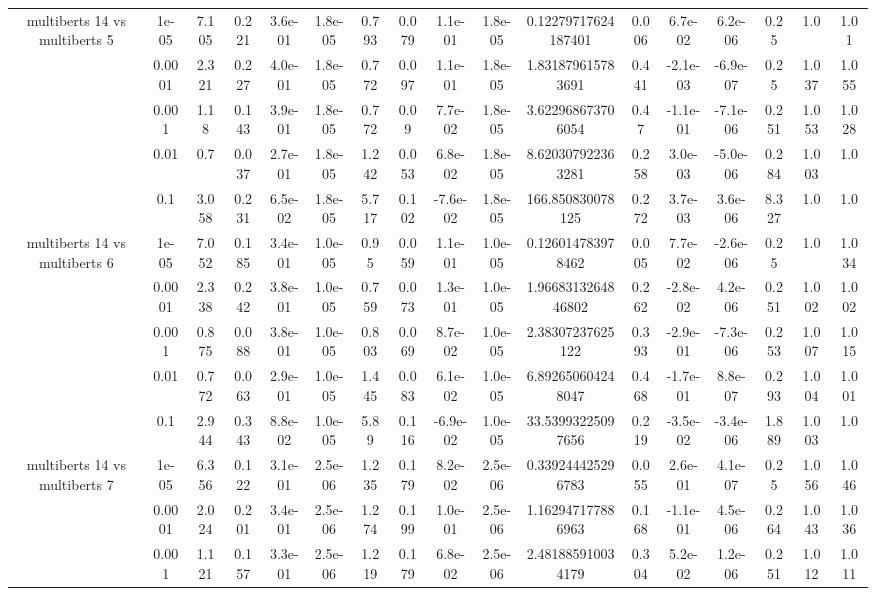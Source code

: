 \begin{tabular}{|c|c|c|c|c|c|c|c|c|c|c|c|c|c|c|c|c|}
\hline
\multirow{5}{*}{multiberts 14 vs multiberts 5} & 1e-05 & 7.105 & 0.221 & 3.6e-01 & 1.8e-05 & 0.793 & 0.079 & 1.1e-01 & 1.8e-05 & 0.12279717624187401 & 0.006 & 6.7e-02 & 6.2e-06 & 0.25 & 1.0 & 1.01 \\
 & 0.0001 & 2.321 & 0.227 & 4.0e-01 & 1.8e-05 & 0.772 & 0.097 & 1.1e-01 & 1.8e-05 & 1.831879615783691 & 0.441 & -2.1e-03 & -6.9e-07 & 0.25 & 1.037 & 1.055 \\
 & 0.001 & 1.18 & 0.143 & 3.9e-01 & 1.8e-05 & 0.772 & 0.09 & 7.7e-02 & 1.8e-05 & 3.622968673706054 & 0.47 & -1.1e-01 & -7.1e-06 & 0.251 & 1.053 & 1.028 \\
 & 0.01 & 0.7 & 0.037 & 2.7e-01 & 1.8e-05 & 1.242 & 0.053 & 6.8e-02 & 1.8e-05 & 8.620307922363281 & 0.258 & 3.0e-03 & -5.0e-06 & 0.284 & 1.003 & 1.0 \\
 & 0.1 & 3.058 & 0.231 & 6.5e-02 & 1.8e-05 & 5.717 & 0.102 & -7.6e-02 & 1.8e-05 & 166.850830078125 & 0.272 & 3.7e-03 & 3.6e-06 & 8.327 & 1.0 & 1.0 \\
\hline
\multirow{5}{*}{multiberts 14 vs multiberts 6} & 1e-05 & 7.052 & 0.185 & 3.4e-01 & 1.0e-05 & 0.95 & 0.059 & 1.1e-01 & 1.0e-05 & 0.126014783978462 & 0.005 & 7.7e-02 & -2.6e-06 & 0.25 & 1.0 & 1.034 \\
 & 0.0001 & 2.338 & 0.242 & 3.8e-01 & 1.0e-05 & 0.759 & 0.073 & 1.3e-01 & 1.0e-05 & 1.9668313264846802 & 0.262 & -2.8e-02 & 4.2e-06 & 0.251 & 1.002 & 1.002 \\
 & 0.001 & 0.875 & 0.088 & 3.8e-01 & 1.0e-05 & 0.803 & 0.069 & 8.7e-02 & 1.0e-05 & 2.38307237625122 & 0.393 & -2.9e-01 & -7.3e-06 & 0.253 & 1.007 & 1.015 \\
 & 0.01 & 0.772 & 0.063 & 2.9e-01 & 1.0e-05 & 1.445 & 0.083 & 6.1e-02 & 1.0e-05 & 6.892650604248047 & 0.468 & -1.7e-01 & 8.8e-07 & 0.293 & 1.004 & 1.001 \\
 & 0.1 & 2.944 & 0.343 & 8.8e-02 & 1.0e-05 & 5.89 & 0.116 & -6.9e-02 & 1.0e-05 & 33.53993225097656 & 0.219 & -3.5e-02 & -3.4e-06 & 1.889 & 1.003 & 1.0 \\
\hline
\multirow{5}{*}{multiberts 14 vs multiberts 7} & 1e-05 & 6.356 & 0.122 & 3.1e-01 & 2.5e-06 & 1.235 & 0.179 & 8.2e-02 & 2.5e-06 & 0.339244425296783 & 0.055 & 2.6e-01 & 4.1e-07 & 0.25 & 1.056 & 1.046 \\
 & 0.0001 & 2.024 & 0.201 & 3.4e-01 & 2.5e-06 & 1.274 & 0.199 & 1.0e-01 & 2.5e-06 & 1.162947177886963 & 0.168 & -1.1e-01 & 4.5e-06 & 0.264 & 1.043 & 1.036 \\
 & 0.001 & 1.121 & 0.157 & 3.3e-01 & 2.5e-06 & 1.219 & 0.179 & 6.8e-02 & 2.5e-06 & 2.481885910034179 & 0.304 & 5.2e-02 & 1.2e-06 & 0.251 & 1.012 & 1.011 \\

\end{tabular}
